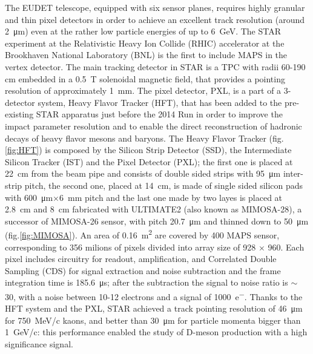         The EUDET telescope, equipped with six sensor planes, requires highly granular and thin pixel detectors in order to achieve an excellent track resolution (around \SI{2}{\um}) even at the rather low particle energies of up to \SI{6}{GeV}.
        The STAR experiment at the Relativistic Heavy Ion Collide (RHIC) accelerator at the Brookhaven National Laboratory (BNL) is the first to include MAPS in the vertex detector\cite{STAR}.
        The main tracking detector in STAR is a TPC with radii 60-190 cm  embedded in a \SI{0.5}{T} solenoidal magnetic field, that provides a pointing resolution of approximately \SI{1}{mm}. 
        The pixel detector, PXL, is a part of a 3-detector system, Heavy Flavor Tracker (HFT), that has been added to the pre-existing STAR apparatus just before the 2014 Run in order to improve the impact parameter resolution and to enable the direct reconstruction of hadronic decays of heavy flavor mesons and baryons.     
        The Heavy Flavor Tracker (fig.\ref{fig:HFT}) is composed by the Silicon Strip Detector (SSD), the Intermediate Silicon Tracker (IST) and the Pixel Detector (PXL); the first one is placed at \SI{22}{cm} from the beam pipe and consists of double sided strips with \SI{95}{\um} inter-strip pitch, the second one, placed at \SI{14}{cm}, is made of single sided silicon pads with \SI{600}{\um}$\times$\SI{6}{mm} pitch and the last one made by two layes is placed at \SI{2.8}{cm} and \SI{8}{cm} fabricated with ULTIMATE2 (also known as MIMOSA-28), a successor of MIMOSA-26 sensor, with pitch \SI{20.7}{\um} and thinned down to \SI{50}{\um} (fig.\ref{fig:MIMOSA}).
        An area of \SI{0.16}{m\squared} are covered by 400 MAPS sensor, corresponding to 356 milions of pixels divided into array size of 928 $\times$ 960.
        Each pixel includes circuitry for readout, amplification, and Correlated Double Sampling (CDS) for signal extraction and noise subtraction and the frame integration time is \SI{185.6}{\us}; after the subtraction the signal to noise ratio is $\sim$ 30, with a noise between 10-12 electrons and a signal of \SI{1000}{e^-}.
        Thanks to the HFT system and the PXL, STAR achieved a track pointing resolution of \SI{46}{\um} for \SI{750}{MeV/c} kaons, and better than \SI{30}{\um} for particle momenta bigger than \SI{1}{GeV/c}: this performance enabled the study of D-meson production with a high significance signal.

